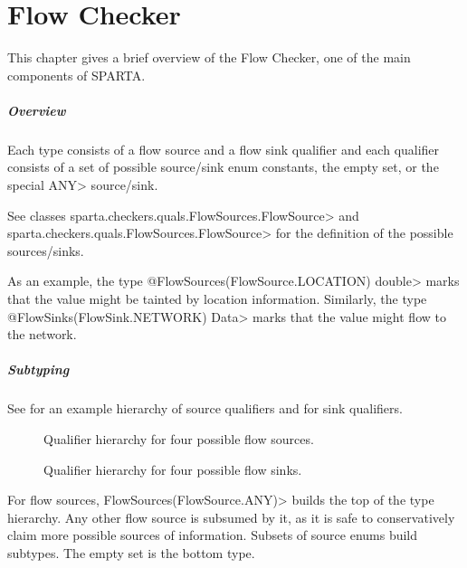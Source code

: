 \htmlhr
\chapter{Flow Checker\label{flow-checker}}

This chapter gives a brief overview of the Flow Checker, one of
the main components of SPARTA.

\paragraph{Overview}

Each type consists of a flow source and a flow sink qualifier and each
qualifier consists of a set of possible source/sink enum constants,
the empty set, or the special \<ANY> source/sink.

See classes
\<sparta.checkers.quals.FlowSources.FlowSource> and\\
\<sparta.checkers.quals.FlowSources.FlowSource> for the definition of
the possible sources/sinks.

As an example, the type
\<@FlowSources(FlowSource.LOCATION) double>
marks that the value might be tainted by location information.
Similarly, the type
\<@FlowSinks(FlowSink.NETWORK) Data>
marks that the value might flow to the network.


\paragraph{Subtyping}

See  for an example hierarchy of
source qualifiers and  for sink
qualifiers.


\begin{figure}
\caption{Qualifier hierarchy for four possible flow sources.}
\label{fig:flowsources-hierarchy}
\end{figure}

\begin{figure}
\caption{Qualifier hierarchy for four possible flow sinks.}
\label{fig:flowsinks-hierarchy}
\end{figure}

For flow sources, \<FlowSources(FlowSource.ANY)> builds the top of the
type hierarchy. Any other flow source is subsumed by it, as it is safe
to conservatively claim more possible sources of information.
Subsets of source enums build subtypes.
The empty set is the bottom type.


